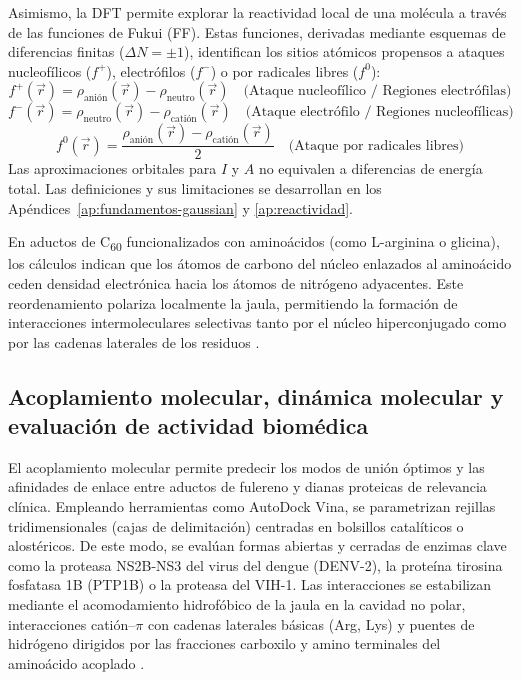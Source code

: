 Asimismo, la DFT permite explorar la reactividad local de una molécula a través de las funciones de Fukui (FF). Estas funciones, derivadas mediante esquemas de diferencias finitas ($\Delta N = \pm 1$), identifican los sitios atómicos propensos a ataques nucleofílicos ($f^+$), electrófilos ($f^-$) o por radicales libres ($f^0$):
\begin{equation}
f^+(\vec{r}) = \rho_{\text{anión}}(\vec{r}) - \rho_{\text{neutro}}(\vec{r}) \quad \text{(Ataque nucleofílico / Regiones electrófilas)}
\end{equation}
\begin{equation}
f^-(\vec{r}) = \rho_{\text{neutro}}(\vec{r}) - \rho_{\text{catión}}(\vec{r}) \quad \text{(Ataque electrófilo / Regiones nucleofílicas)}
\end{equation}
\begin{equation}
f^0(\vec{r}) = \frac{\rho_{\text{anión}}(\vec{r}) - \rho_{\text{catión}}(\vec{r})}{2} \quad \text{(Ataque por radicales libres)}
\end{equation}
Las aproximaciones orbitales para $I$ y $A$ no equivalen a diferencias de energía total. Las definiciones y sus limitaciones se desarrollan en los Apéndices~\ref{ap:fundamentos-gaussian} y \ref{ap:reactividad}.

En aductos de C\textsubscript{60} funcionalizados con aminoácidos (como L-arginina o glicina), los cálculos indican que los átomos de carbono del núcleo enlazados al aminoácido ceden densidad electrónica hacia los átomos de nitrógeno adyacentes. Este reordenamiento polariza localmente la jaula, permitiendo la formación de interacciones intermoleculares selectivas tanto por el núcleo hiperconjugado como por las cadenas laterales de los residuos \cite{moncada2008caracterizacion, gaur2021biomedical}.

\subsection{Acoplamiento molecular, dinámica molecular y evaluación de actividad biomédica}
El acoplamiento molecular permite predecir los modos de unión óptimos y las afinidades de enlace entre aductos de fulereno y dianas proteicas de relevancia clínica. Empleando herramientas como AutoDock Vina, se parametrizan rejillas tridimensionales (cajas de delimitación) centradas en bolsillos catalíticos o alostéricos. De este modo, se evalúan formas abiertas y cerradas de enzimas clave como la proteasa NS2B-NS3 del virus del dengue (DENV-2), la proteína tirosina fosfatasa 1B (PTP1B) o la proteasa del VIH-1. Las interacciones se estabilizan mediante el acomodamiento hidrofóbico de la jaula en la cavidad no polar, interacciones catión--$\pi$ con cadenas laterales básicas (Arg, Lys) y puentes de hidrógeno dirigidos por las fracciones carboxilo y amino terminales del aminoácido acoplado \cite{nelson2022principios,jiang2015synthesis, wang2024strain}.

